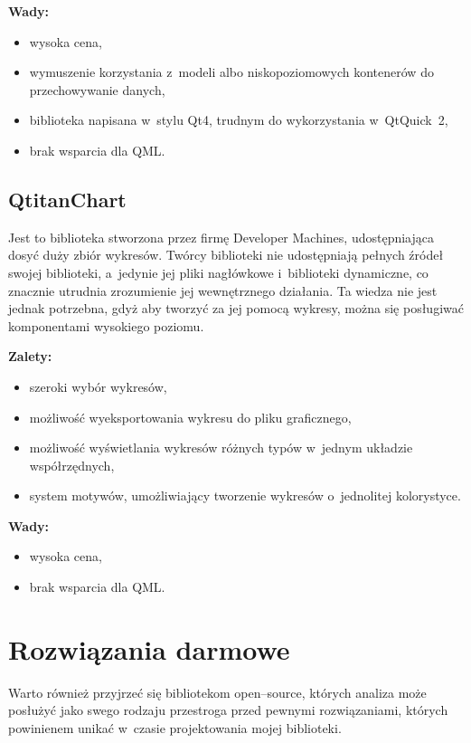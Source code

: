 \textbf{Wady:}
\begin{itemize}
\item{wysoka cena,}
\item{wymuszenie korzystania z~modeli albo niskopoziomowych kontenerów do przechowywanie danych,}
\item{biblioteka napisana w~stylu Qt4, trudnym do wykorzystania w~QtQuick~2,}
\item{brak wsparcia dla QML.}
\end{itemize}

\subsection{QtitanChart}
Jest to biblioteka stworzona przez firmę Developer Machines, udostępniająca dosyć duży zbiór wykresów. Twórcy biblioteki nie udostępniają pełnych źródeł swojej biblioteki, a~jedynie jej pliki nagłówkowe i~biblioteki dynamiczne, co znacznie utrudnia zrozumienie jej wewnętrznego działania. Ta wiedza nie jest jednak potrzebna, gdyż aby tworzyć za jej pomocą wykresy, można się posługiwać komponentami wysokiego poziomu.\newline

\textbf{Zalety:}
\begin{itemize}
\item{szeroki wybór wykresów,}
\item{możliwość wyeksportowania wykresu do pliku graficznego,}
\item{możliwość wyświetlania wykresów różnych typów w~jednym układzie współrzędnych,}
\item{system motywów, umożliwiający tworzenie wykresów o~jednolitej kolorystyce.}\newline
\end{itemize}

\textbf{Wady:}
\begin{itemize}
\item{wysoka cena,}
\item{brak wsparcia dla QML.}
\end{itemize}


\section{Rozwiązania darmowe}
Warto również przyjrzeć się bibliotekom open--source, których analiza może posłużyć jako swego rodzaju przestroga przed pewnymi rozwiązaniami, których powinienem unikać w~czasie projektowania mojej biblioteki.


